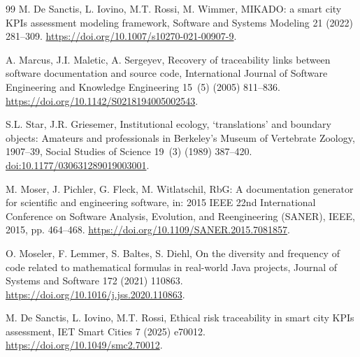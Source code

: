 \documentclass[a4paper,fleqn]{cas-dc}
\begin{document}
\begin{thebibliography}{99}
M. De Sanctis, L. Iovino, M.T. Rossi, M. Wimmer,
\newblock MIKADO: a smart city KPIs assessment modeling framework,
\newblock Software and Systems Modeling 21 (2022) 281--309.
\newblock \url{https://doi.org/10.1007/s10270-021-00907-9}.

A. Marcus, J.I. Maletic, A. Sergeyev,
\newblock Recovery of traceability links between software documentation and source code,
\newblock International Journal of Software Engineering and Knowledge Engineering 15~(5) (2005) 811--836.
\newblock \url{https://doi.org/10.1142/S0218194005002543}.

S.L. Star, J.R. Griesemer,
\newblock Institutional ecology, `translations' and boundary objects: Amateurs and professionals in Berkeley's Museum of Vertebrate Zoology, 1907--39,
\newblock Social Studies of Science 19~(3) (1989) 387--420.
\newblock \href{https://doi.org/10.1177/030631289019003001}{doi:10.1177/030631289019003001}.


M. Moser, J. Pichler, G. Fleck, M. Witlatschil,
\newblock RbG: A documentation generator for scientific and engineering software,
\newblock in: 2015 IEEE 22nd International Conference on Software Analysis, Evolution, and Reengineering (SANER), IEEE, 2015, pp. 464--468.
\newblock \url{https://doi.org/10.1109/SANER.2015.7081857}.

O. Moseler, F. Lemmer, S. Baltes, S. Diehl,
\newblock On the diversity and frequency of code related to mathematical formulas in real-world Java projects,
\newblock Journal of Systems and Software 172 (2021) 110863.
\newblock \url{https://doi.org/10.1016/j.jss.2020.110863}.

M. De Sanctis, L. Iovino, M.T. Rossi,
\newblock Ethical risk traceability in smart city KPIs assessment,
\newblock IET Smart Cities 7 (2025) e70012.
\newblock \url{https://doi.org/10.1049/smc2.70012}.

\end{thebibliography}
\end{document}
